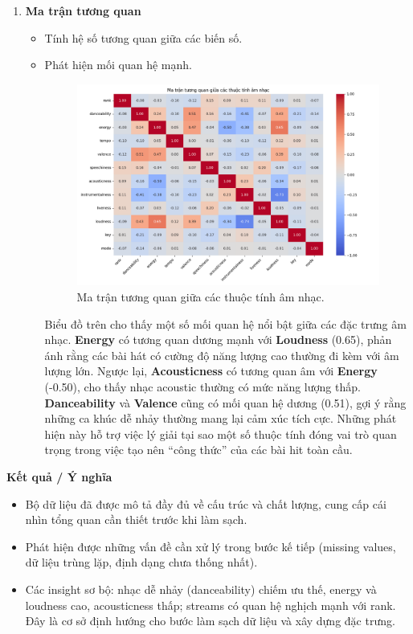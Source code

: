 \begin{enumerate}[label=\arabic*]
    \item \textbf{Ma trận tương quan}
    \begin{itemize}
        \item Tính hệ số tương quan giữa các biến số.
        \item Phát hiện mối quan hệ mạnh.
        \begin{figure}[H] %
            \centering
            \includegraphics[width=1.0\textwidth]{../graphics/data3/Output/step1/correlation_matrix.png}
            \caption{Ma trận tương quan giữa các thuộc tính âm nhạc.}
            \label{fig:missing}
        \end{figure}
    Biểu đồ trên cho thấy một số mối quan hệ nổi bật giữa các đặc trưng âm nhạc. \textbf{Energy} có tương quan dương mạnh với \textbf{Loudness} (0.65), phản ánh rằng các bài hát có cường độ năng lượng cao thường đi kèm với âm lượng lớn. Ngược lại, \textbf{Acousticness} có tương quan âm với \textbf{Energy} (-0.50), cho thấy nhạc acoustic thường có mức năng lượng thấp. \textbf{Danceability} và \textbf{Valence} cũng có mối quan hệ dương (0.51), gợi ý rằng những ca khúc dễ nhảy thường mang lại cảm xúc tích cực. Những phát hiện này hỗ trợ việc lý giải tại sao một số thuộc tính đóng vai trò quan trọng trong việc tạo nên “công thức” của các bài hit toàn cầu.
    \end{itemize}
\end{enumerate}

\textbf{Kết quả / Ý nghĩa} 

\begin{itemize}
    \item Bộ dữ liệu đã được mô tả đầy đủ về cấu trúc và chất lượng, cung cấp cái nhìn tổng quan cần thiết trước khi làm sạch.
    \item Phát hiện được những vấn đề cần xử lý trong bước kế tiếp (missing values, dữ liệu trùng lặp, định dạng chưa thống nhất).
    \item Các insight sơ bộ: nhạc dễ nhảy (danceability) chiếm ưu thế, energy và loudness cao, acousticness thấp; 
    streams có quan hệ nghịch mạnh với rank. Đây là cơ sở định hướng cho bước làm sạch dữ liệu và xây dựng đặc trưng.
\end{itemize}
